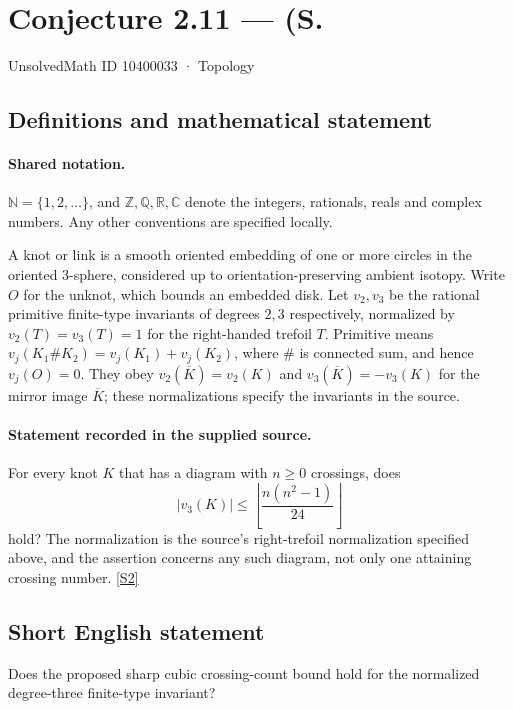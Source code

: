\documentclass[11pt]{article}
\newcommand{\sref}[2]{\hyperlink{source:#1:#2}{[S#2]}}
\begin{document}
\setcounter{section}{10400032}
\section{Conjecture 2.11 — (S.}\label{10400033}
{\small\sffamily UnsolvedMath ID 10400033 · Topology}
\subsection{Definitions and mathematical statement}

\paragraph{Shared notation.}$\mathbb N=\{1,2,\ldots\}$, and $\mathbb Z,\mathbb Q,\mathbb R,\mathbb C$ denote the integers, rationals, reals and complex numbers. Any other conventions are specified locally.


A knot or link is a smooth oriented embedding of one or more circles in the oriented $3$-sphere, considered up to orientation-preserving ambient isotopy. Write $O$ for the unknot, which bounds an embedded disk. Let $v_2,v_3$ be the rational primitive finite-type invariants of degrees $2,3$ respectively, normalized by $v_2(T)=v_3(T)=1$ for the right-handed trefoil $T$. Primitive means $v_j(K_1\#K_2)=v_j(K_1)+v_j(K_2)$, where $\#$ is connected sum, and hence $v_j(O)=0$. They obey $v_2(\overline K)=v_2(K)$ and $v_3(\overline K)=-v_3(K)$ for the mirror image $\overline K$; these normalizations specify the invariants in the source.
\paragraph{Statement recorded in the supplied source.}
For every knot $K$ that has a diagram with $n\ge0$ crossings, does
\[|v_3(K)|\le\left\lfloor\frac{n(n^2-1)}{24}\right\rfloor\]
hold? The normalization is the source's right-trefoil normalization specified above, and the assertion concerns any such diagram, not only one attaining crossing number. \sref{10400033}{2}
\subsection{Short English statement}
Does the proposed sharp cubic crossing-count bound hold for the normalized degree-three finite-type invariant?
\end{document}
